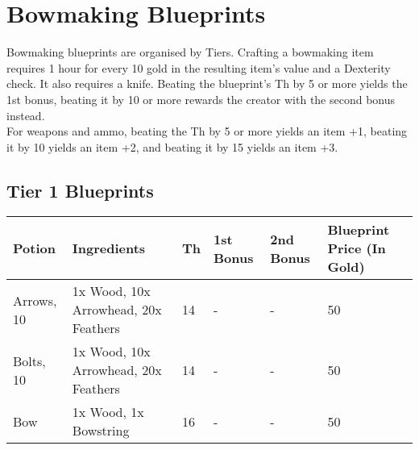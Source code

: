 \section{Bowmaking Blueprints}\label{sec:bowmakingBlueprints}
Bowmaking blueprints are organised by Tiers.
Crafting a bowmaking item requires 1 hour for every 10 gold in the resulting item's value and a Dexterity check.
It also requires a knife.
Beating the blueprint's Th by 5 or more yields the 1st bonus, beating it by 10 or more rewards the creator with the second bonus instead.\\
For weapons and ammo, beating the Th by 5 or more yields an item +1, beating it by 10 yields an item +2, and beating it by 15 yields an item +3.\\


\subsection{Tier 1 Blueprints}
\begin{longtable}{l | p{2.5cm} | l | p{1.5cm} | p{1.5cm} | p{1cm} }
	Potion & Ingredients & Th & 1st Bonus & 2nd Bonus & Blueprint Price (In Gold)\\ \hline
	Arrows, 10 & 1x Wood, 10x Arrowhead, 20x Feathers & 14 & - & - & 50\\
	Bolts, 10 & 1x Wood, 10x Arrowhead, 20x Feathers & 14 & - & - & 50\\
	Bow & 1x Wood, 1x Bowstring & 16 & - & - & 50\\
\end{longtable}